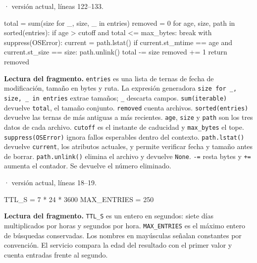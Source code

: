\documentclass[11pt,a4paper]{article}
\begin{document}
\smallskip
{\footnotesize\texttt{} · versión actual, líneas 122--133.}\par
\begin{Codigo}[firstnumber=122]
        total = sum(size for _, size, _ in entries)
        removed = 0
        for age, size, path in sorted(entries):
            if age > cutoff and total <= max_bytes:
                break
            with suppress(OSError):
                current = path.lstat()
                if current.st_mtime == age and current.st_size == size:
                    path.unlink()
                    total -= size
                    removed += 1
        return removed
\end{Codigo}

\textbf{Lectura del fragmento.} \texttt{entries} es una lista de ternas de fecha de modificación, tamaño en bytes y ruta. La expresión generadora \texttt{size for \_, size, \_ in entries} extrae tamaños; \texttt{\_} descarta campos. \texttt{sum(iterable)} devuelve \texttt{total}, el tamaño conjunto. \texttt{removed} cuenta archivos. \texttt{sorted(entries)} devuelve las ternas de más antiguas a más recientes. \texttt{age}, \texttt{size} y \texttt{path} son los tres datos de cada archivo. \texttt{cutoff} es el instante de caducidad y \texttt{max\_bytes} el tope. \texttt{suppress(OSError)} ignora fallos esperables dentro del contexto. \texttt{path.lstat()} devuelve \texttt{current}, los atributos actuales, y permite verificar fecha y tamaño antes de borrar. \texttt{path.unlink()} elimina el archivo y devuelve \texttt{None}. \texttt{-=} resta bytes y \texttt{+=} aumenta el contador. Se devuelve el número eliminado.


\smallskip
{\footnotesize\texttt{} · versión actual, líneas 18--19.}\par
\begin{Codigo}[firstnumber=18]
TTL_S = 7 * 24 * 3600
MAX_ENTRIES = 250
\end{Codigo}

\textbf{Lectura del fragmento.} \texttt{TTL\_S} es un entero en segundos: siete días multiplicados por horas y segundos por hora. \texttt{MAX\_ENTRIES} es el máximo entero de búsquedas conservadas. Los nombres en mayúsculas señalan constantes por convención. El servicio compara la edad del resultado con el primer valor y cuenta entradas frente al segundo.
\end{document}
